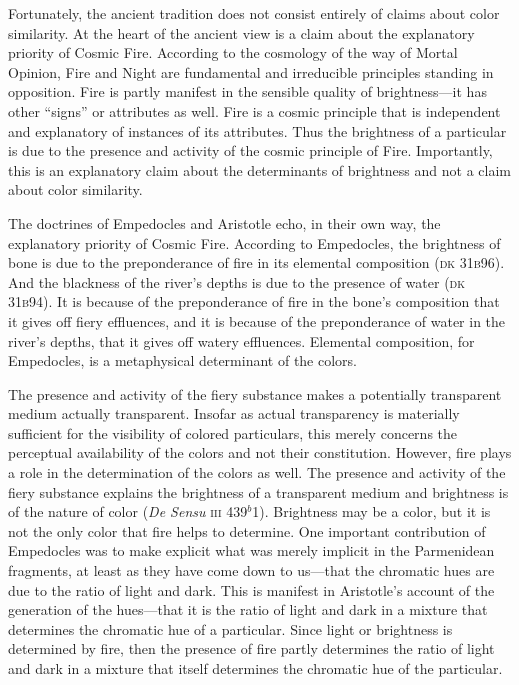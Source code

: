 Fortunately, the ancient tradition does not consist entirely of claims about color similarity. At the heart of the ancient view is a claim about the explanatory priority of Cosmic Fire. According to the cosmology of the way of Mortal Opinion, Fire and Night are fundamental and irreducible principles standing in opposition. Fire is partly manifest in the sensible quality of brightness---it has other ``signs'' or attributes as well. Fire is a cosmic principle that is independent and explanatory of instances of its attributes. Thus the brightness of a particular is due to the presence and activity of the cosmic principle of Fire. Importantly, this is an explanatory claim about the determinants of brightness and not a claim about color similarity. 

The doctrines of Empedocles and Aristotle echo, in their own way, the explanatory priority of Cosmic Fire. According to Empedocles, the brightness of bone is due to the preponderance of fire in its elemental composition (\textsc{dk} 31\textsc{b}96). And the blackness of the river's depths is due to the presence of water (\textsc{dk} 31\textsc{b}94). It is because of the preponderance of fire in the bone's composition that it gives off fiery effluences, and it is because of the preponderance of water in the river's depths, that it gives off watery effluences. Elemental composition, for Empedocles, is a metaphysical determinant of the colors.

The presence and activity of the fiery substance makes a potentially transparent medium actually transparent. Insofar as actual transparency is materially sufficient for the visibility of colored particulars, this merely concerns the perceptual availability of the colors and not their constitution. However, fire plays a role in the determination of the colors as well. The presence and activity of the fiery substance explains the brightness of a transparent medium and brightness is of the nature of color (\emph{De Sensu} \textsc{iii} 439\( ^{b} \)1). Brightness may be a color, but it is not the only color that fire helps to determine. One important contribution of Empedocles was to make explicit what was merely implicit in the Parmenidean fragments, at least as they have come down to us---that the chromatic hues are due to the ratio of light and dark. This is manifest in Aristotle's account of the generation of the hues---that it is the ratio of light and dark in a mixture that determines the chromatic hue of a particular. Since light or brightness is determined by fire, then the presence of fire partly determines the ratio of light and dark in a mixture that itself determines the chromatic hue of the particular.

